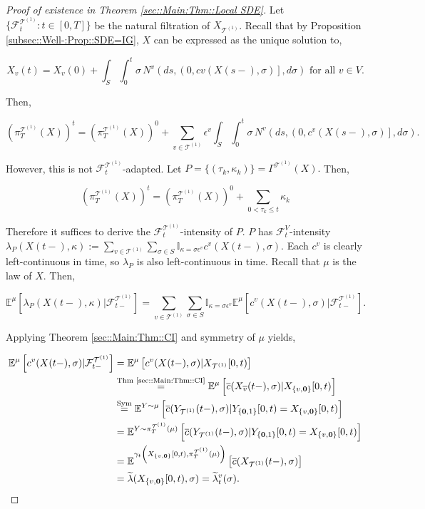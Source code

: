 \documentclass[12pt]{article}
\newcommand{\mb}{\mathbb}
\newcommand{\mc}{\mathcal}
\newcommand{\ov}{\overline}
\newcommand{\os}{\overset}
\newcommand{\te}{\text}
\newcommand{\ep}{\epsilon}
\newcommand{\exmu}[2]{\mb{E}^{#1}\left[#2\right]}	%
\renewcommand{\root}{\mathbf{0}}				%
\renewcommand{\v}{v}							%
\renewcommand{\S}{S}							%
\newcommand{\s}{\sigma}							%
\newcommand{\ev}{\ep}							%
\newcommand{\T}{T}								%
\renewcommand{\t}{t}							%
\newcommand{\proj}{\pi}							%
\renewcommand{\tt}{s}							%
\newcommand{\F}{\mc{F}}							%
\newcommand{\X}{X}								%
\newcommand{\IGr}{c}							%
\newcommand{\vind}[1]{^{#1}}					%
\newcommand{\vsi}[1]{^{#1}}						%
\newcommand{\cind}[1]{_{#1}}					%
\newcommand{\cl}{\ov}							%
\newcommand{\tp}[1]{(#1)}						%
\newcommand{\tip}[1]{#1}						%
\newcommand{\ts}[1]{_{#1}}						%
\newcommand{\IGrg}{\ov{c}}						%
\newcommand{\tree}{\mc{T}}						%
\newcommand{\sln}[1]{^{(#1)}}					%
\newcommand{\poiss}{N}							%
\newcommand{\rate}{\lambda}						%
\newcommand{\alt}[1]{\widetilde{#1}}			%
\newcommand{\pra}[1]{_{#1}}						%
\newcommand{\indx}[1]{_{#1}}					%
\newcommand{\m}{\mu}							%
\newcommand{\cm}{\gamma}						%
\newcommand{\XX}{Y}								%
\newcommand{\rt}{\tau}							%
\renewcommand{\it}{k}							%
\newcommand{\pmap}{\Gamma}						%
\renewcommand{\mark}{\kappa}					%
\newcommand{\rp}{P}								%
\newcommand{\crate}{\alt{\lambda}}				%
\begin{document}
\begin{proof}[Proof of existence in Theorem \ref{sec::Main:Thm::Local SDE}]

Let \(\{\F\vsi{\tree\sln{1}}\ts{\t}:\t\in [0,\T]\}\) be the natural filtration of \(\X\cind{\tree\sln{1}}\). Recall that by Proposition \ref{subsec::Well-:Prop::SDE=IG}, \(\X\) can be expressed as the unique solution to,

\[\X\cind{\v}\tp{\t} = \X\cind{\v}\tp{0} + \int_\S\int_0^\t \s\,\poiss\vind{\v}\left(d\tt,\left(0,c{\v}(\X\tp{\tt-},\s)\right],d\s\right) \te{ for all } \v \in V.\]

Then,

\[\left(\proj\vsi{\tree\sln{1}}\ts{\T}(\X)\right)^\t = \left(\proj\vsi{\tree\sln{1}}\ts{\T}(\X)\right)^0 + \sum_{\v \in \tree\sln{1}}\ev\vind{\v}\int_\S\int_0^\t \s\,\poiss\vind{\v}\left(d\tt,\left(0,\IGr\vind{\v}(\X\tp{\tt-},\s)\right],d\s\right).\]

However, this is not \(\F\vsi{\tree\sln{1}}\ts{\t}\)-adapted. Let \(\rp = \{(\rt\indx{\it},\mark\indx{\it})\} = \pmap\vind{\tree\sln{1}}(\X).\) Then,

\[\left(\proj\vsi{\tree\sln{1}}\ts{\T}(\X)\right)^\t = \left(\proj\vsi{\tree\sln{1}}\ts{\T}(\X)\right)^0 + \sum_{0 < \rt\indx{\it} \leq \t}\mark\indx{\it}\]

Therefore it suffices to derive the \(\F\vsi{\tree\sln{1}}\ts{\t}\)-intensity of \(\rp\). \(\rp\) has \(\F\vsi{V}\ts{\t}\)-intensity \(\rate\pra{\rp}(\X\tp{\t-},\mark) := \sum_{\v \in \tree\sln{1}}\sum_{\s\in \S}\mb{I}_{\mark = \s\ev\vind{\v}}\IGr\vind{\v}(\X\tp{\t-},\s)\). Each \(\IGr\vind{\v}\) is clearly left-continuous in time, so \(\rate\pra{\rp}\) is also left-continuous in time. Recall that \(\m\) is the law of \(\X\). Then,

\[\exmu{\m}{\rate\pra{\rp}(\X\tp{\t-},\mark)|\F\vsi{\tree\sln{1}}\ts{\t-}} = \sum_{\v \in \tree\sln{1}}\sum_{\s\in \S} \mb{I}_{\mark = \s\ev\vind{\v}}\exmu{\m}{\IGr\vind{\v}(\X\tp{\t-},\s)|\F\vsi{\tree\sln{1}}\ts{\t-}}.\]

Applying Theorem \ref{sec::Main:Thm::CI} and symmetry of \(\m\) yields,

\begin{align*}
\exmu{\m}{\IGr\vind{\v}(\X\tp{\t-},\s)|\F\vsi{\tree\sln{1}}\ts{\t-}} &= \exmu{\m}{\IGr\vind{\v}(\X\tp{\t-},\s)|\X\cind{\tree\sln{1}}\tip{[0,\t)}}\\
&\os{\te{Thm \ref{sec::Main:Thm::CI}}}{=} \exmu{\m}{\IGrg{}(\X\cind{\cl{\v}}\tp{\t-},\s)|\X\cind{\{\v,\root\}}\tip{[0,\t)}} \\
&\os{\te{Sym}}{=} \exmu{\XX\sim \m}{\IGrg{}(\XX\cind{\tree\sln{1}}\tp{\t-},\s)|\XX\cind{\{\root,1\}}\tip{[0,\t)} = \X\cind{\{\v,\root\}}\tip{[0,\t)}}\\
&= \exmu{\XX\sim \proj\vsi{\tree\sln{1}}\ts{\T}(\m)}{\IGrg{}(\XX\cind{\tree\sln{1}}\tp{\t-},\s)|\XX\cind{\{\root,1\}}\tip{[0,\t)} = \X\cind{\{\v,\root\}}\tip{[0,\t)}}\\
&= \exmu{\cm\ts{\t}\left(\X\cind{\{\v,\root\}}\tip{[0,\t)},\proj\vsi{\tree\sln{1}}\ts{\T}(\m)\right)}{\IGrg{}(\X\cind{\tree\sln{1}}\tp{\t-},\s)}\\
&=\crate(\X\cind{\{\v,\root\}}\tip{[0,\t)},\s) = \crate\vind{\v}\ts{\t}(\s).
\end{align*}


\end{proof}
\end{document}
